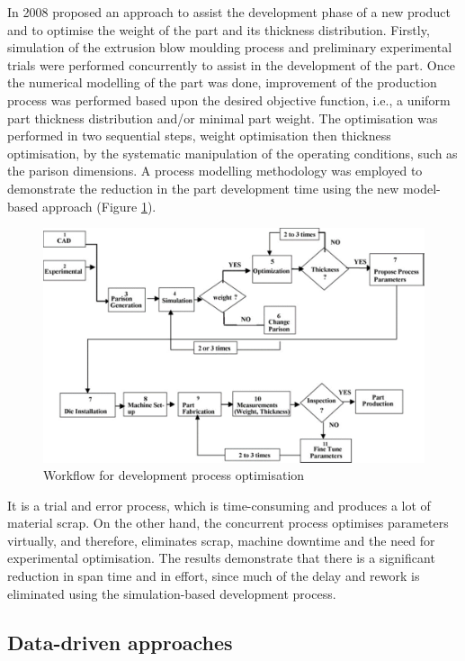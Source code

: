 In 2008 \citep{attar2008manufacturing} proposed an approach to assist the development phase of a new product and to optimise the weight of the part and its thickness distribution. Firstly, simulation of the extrusion blow moulding process and preliminary experimental trials were performed concurrently to assist in the development of the part. Once the numerical modelling of the part was done, improvement of the production process was performed based upon the desired objective function, i.e., a uniform part thickness distribution and/or minimal part weight. The optimisation was performed in two sequential steps, weight optimisation then thickness optimisation, by the systematic manipulation of the operating conditions, such as the parison dimensions. A process modelling methodology was employed to demonstrate the reduction in the part development time using the new model-based approach (Figure \ref{fig:workflow_development_process_optimisation}).
\begin{figure}
\centerline{\includegraphics[scale=0.6]{images/chapter_2/optimisation_flow.png}}
\caption{Workflow for development process optimisation \citep{attar2008manufacturing}}
\label{fig:workflow_development_process_optimisation}
\end{figure}
It is a trial and error process, which is time-consuming and produces a lot of material scrap. On the other hand, the concurrent process optimises parameters virtually, and therefore, eliminates scrap, machine downtime and the need for experimental optimisation. The results demonstrate that there is a significant reduction in span time and in effort, since much of the delay and rework is eliminated using the simulation-based development process.


\subsection{Data-driven approaches} \label{Data-driven approaches}


